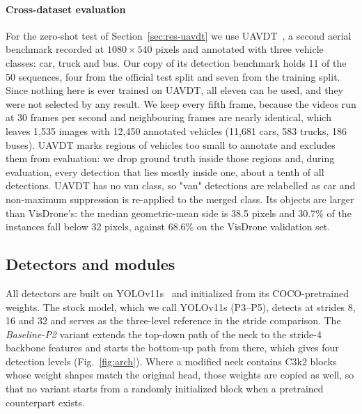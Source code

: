 \documentclass[preprint,12pt]{elsarticle}
\begin{document}
\paragraph{Cross-dataset evaluation}
For the zero-shot test of Section~\ref{sec:res-uavdt} we use UAVDT~\cite{uavdt}, a
second aerial benchmark recorded at $1080\times540$ pixels and annotated with three
vehicle classes: car, truck and bus. Our copy of its detection benchmark holds 11 of
the 50 sequences, four from the official test split and seven from the training
split. Since nothing here is ever trained on UAVDT, all eleven can be used, and they
were not selected by any result. We keep every fifth frame, because the videos run at
30 frames per second and neighbouring frames are nearly identical, which leaves 1,535
images with 12,450 annotated vehicles (11,681 cars, 583 trucks, 186 buses). UAVDT
marks regions of vehicles too small to annotate and excludes them from evaluation: we
drop ground truth inside those regions and, during evaluation, every detection that
lies mostly inside one, about a tenth of all detections. UAVDT has no van class, so
"van" detections are relabelled as car and non-maximum suppression is re-applied to
the merged class. Its objects are larger than VisDrone's: the median geometric-mean
side is 38.5 pixels and 30.7\% of the instances fall below 32 pixels, against 68.6\%
on the VisDrone validation set.

\subsection{Detectors and modules}
\label{sec:models}

All detectors are built on YOLOv11s~\cite{yolov11} and initialized from its
COCO-pretrained weights. The stock model, which we call YOLOv11s (P3--P5), detects
at strides 8, 16 and 32 and serves as the three-level reference in the stride
comparison. The \emph{Baseline-P2} variant extends the top-down path of the neck to the
stride-4 backbone features and starts the bottom-up path from there, which gives
four detection levels (Fig.~\ref{fig:arch}). Where a modified neck contains C3k2
blocks whose weight shapes match the original head, those weights are copied as
well, so that no variant starts from a randomly initialized block when a
pretrained counterpart exists.
\end{document}
